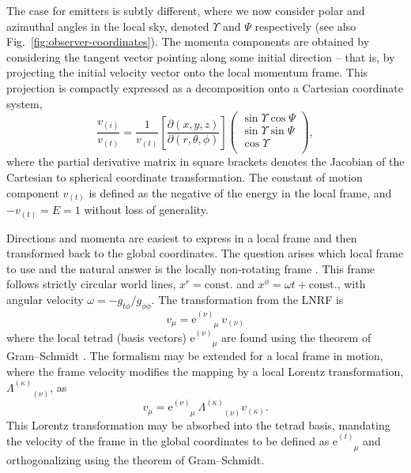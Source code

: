 \documentclass[fleqn,usenatbib]{mnras}
\newcommand{\e}{\text{e}}
\newcommand{\utensor}[3]{#1^{#2}_{\phantom{#2}#3}}
\newcommand{\pderiv}[2]{\frac{\partial #1}{\partial #2}}
\begin{document}
The case for emitters is subtly different, where we now consider polar and
azimuthal angles in the local sky, denoted $\Upsilon$ and $\Psi$ respectively
(see also Fig.~\ref{fig:observer-coordinates}). The momenta components are
obtained by considering the tangent vector pointing along some initial direction
-- that is, by projecting the initial velocity vector onto the local momentum
frame. This projection is compactly expressed as a decomposition onto a
Cartesian coordinate system,
\begin{equation}
    \label{eq:local-angle-to-velocity}
    \frac{v_{(i)}}{v_{(t)}} = \frac{1}{v_{(t)}}
    \left[\pderiv{(x, y, z)}{(r, \theta, \phi)}\right]
    \left(
    \begin{matrix}
        \sin \Upsilon \cos \Psi \\
        \sin \Upsilon \sin \Psi \\
        \cos \Upsilon \\
    \end{matrix}
    \right),
\end{equation}
where the partial derivative matrix in square brackets denotes the Jacobian of
the Cartesian to spherical coordinate transformation. The constant of motion
component $v_{(t)}$ is defined as the negative of the energy in the local frame,
and $-v_{(t)}=E=1$ without loss of generality.

Directions and momenta are easiest to express in a local frame and then
transformed back to the global coordinates. The question arises which local
frame to use and the natural answer is the locally non-rotating frame
\citep[LNRF;][]{bardeen_rotating_1972}. This frame follows strictly circular
world lines, $x^r = \text{const.}$ and $x^\phi = \omega t + \text{const.}$,
with angular velocity $\omega = -g_{t\phi} / g_{\phi\phi}$. The transformation
from the LNRF is
\begin{equation}
    \label{eq:local-to-global-velocity}
    v_\mu = \e^{(\nu)}_{\phantom{(\nu)}\mu}\  v_{(\nu)}
\end{equation}
where the local tetrad (basis vectors) $\e^{(\nu)}_{\phantom{(\nu)}\mu}$ are
found using the theorem of Gram--Schmidt
\citep[][Appendix~\ref{appendix:gram-schmidt}]{schmidt_uber_1989}. The formalism
may be extended for a local frame in motion, where the frame velocity modifies
the mapping by a local Lorentz transformation,
$\Lambda^{(\kappa)}_{\phantom{(\kappa)}(\nu)}$, as
\begin{equation}
    v_\mu = \e^{(\nu)}_{\phantom{(\nu)}\mu}\  \Lambda^{(\kappa)}_{\phantom{(a)}(\nu)} v_{(\kappa)}.
\end{equation}
This Lorentz transformation may be absorbed into the tetrad basis, mandating the
velocity of the frame in the global coordinates to be defined as
$\utensor{\e}{(t)}{\mu}$ and orthogonalizing using the theorem of Gram--Schmidt.
\end{document}
